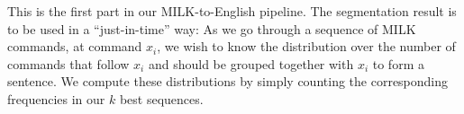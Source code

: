 \documentclass[11pt]{article}
\begin{document}
This is the first part in our MILK-to-English pipeline. The segmentation result is to be used in a ``just-in-time'' way: As we go through a sequence of MILK commands, at command $x_i$, we wish to know the distribution over the number of commands that follow $x_i$ and should be grouped together with $x_i$ to form a sentence. We compute these distributions by simply counting the corresponding frequencies in our $k$ best sequences.

\end{document}
